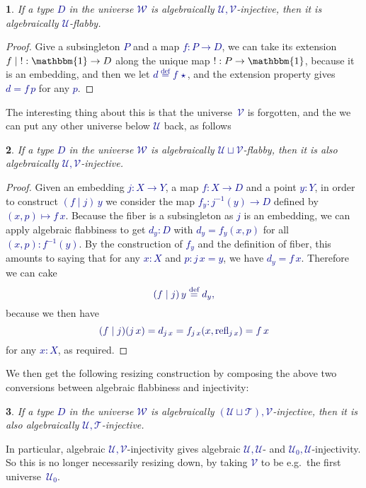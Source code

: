 \documentclass[10pt]{article}
\newcommand{\db}{\textcolor{darkblue}}
\newcommand{\m}[1]{\db{$#1$}}
\newcommand{\M}[1]{\[\db{#1}\]}
\newcommand{\U}{\mathcal{U}}
\newcommand{\V}{\mathcal{V}}
\newcommand{\W}{\mathcal{W}}
\newcommand{\T}{\mathcal{T}}
\newcommand{\One}{\mathbbm{1}}
\newcommand{\one}{\operatorname{\star}}
\newcommand{\refl}{\operatorname{refl}}
\newcommand{\eqdef}{\overset{\text{def}}{=}}
\newtheorem{numbered}{}
\theoremstyle{definition}
\begin{document}
\begin{numbered}
  If a type \m{D} in the universe \m{\W} is algebraically
  \m{\U,\V}-injective, then it is algebraically \m{\U}-flabby.
\end{numbered}
\begin{proof}
  Give a subsingleton \m{P} and a map \m{f : P \to D}, we can take its extension \m{f \mid \operatorname{!}: \One \to D} along the unique map \m{!:P \to \One}, because it is an embedding, and then we let \m{d \eqdef f \, \one}, and the extension property gives \m{d = f \, p} for any \m{p}.
\end{proof}
The interesting thing about this is that the
universe~\m{\V} is forgotten, and the we can put any other universe
below \m{\U} back, as follows

\begin{numbered}
  If a type \m{D} in the universe \m{\W} is algebraically \m{\U \sqcup
    \V}-flabby, then it is also algebraically \m{\U,\V}-injective.
\end{numbered}
\begin{proof}
  Given an embedding \m{j : X \to Y}, a map \m{f : X \to D} and a
  point \m{y:Y}, in order to construct \m{(f \mid j) \, y} we consider
  the map \m{f_y : j^{-1}(y) \to D} defined by \m{(x,p) \mapsto
    f\,x}. Because the fiber is a subsingleton as \m{j} is an
  embedding, we can apply algebraic flabbiness to get \m{d_y : D} with
  \m{d_y = f_y (x,p)} for all \m{(x,p):f^{-1}(y)}. By the construction of
  \m{f_y} and the definition of fiber, this amounts to saying that for
  any \m{x : X} and \m{p : j \, x = y}, we have \m{d_y = f \,
    x}. Therefore we can cake
%
\M{(f \mid j) \, y \eqdef d_y,}
because we then have
%
\M{(f \mid j) (j \, x) = d_{j \, x} = f_{j \, x} (x , \refl_{j \, x}) = f \, x}
%
for any \m{x:X}, as required.
\end{proof}
\noindent We then get the following resizing construction by composing the above
two conversions between algebraic flabbiness and injectivity:
\begin{numbered}
  If a type \m{D} in the universe \m{\W} is algebraically \m{(\U \sqcup
    \T),\V}-injective, then it is also algebraically \m{\U,\T}-injective.
\end{numbered}
\noindent In particular, algebraic \m{\U,\V}-injectivity gives
algebraic \m{\U,\U}- and \m{\U_0,\U}-injectivity.  So this is no
longer necessarily resizing down, by taking \m{\V} to be
e.g.\ the first universe~\m{\U_0}.
\end{document}
